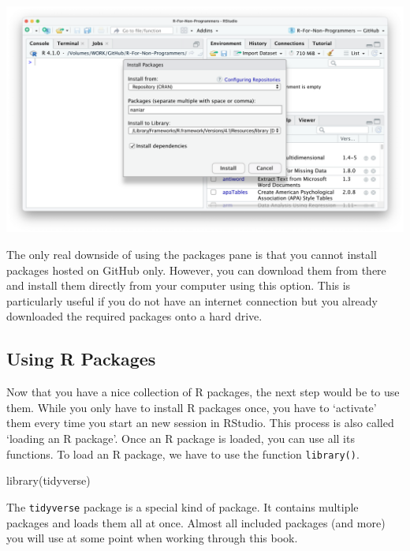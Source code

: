 \documentclass[
]{book}
\newenvironment{Shaded}{\begin{snugshade}}{\end{snugshade}}
\newcommand{\FunctionTok}[1]{\textcolor[rgb]{0.00,0.00,0.00}{#1}}
\newcommand{\NormalTok}[1]{#1}
\begin{document}
\begin{enumerate}
  \includegraphics{images/chapter_05_img/install_r_packages/03_install_r_packages.png}
\end{enumerate}

The only real downside of using the packages pane is that you cannot install packages hosted on GitHub only. However, you can download them from there and install them directly from your computer using this option. This is particularly useful if you do not have an internet connection but you already downloaded the required packages onto a hard drive.

\hypertarget{using-r-packages}{%
\subsection{Using R Packages}\label{using-r-packages}}

Now that you have a nice collection of R packages, the next step would be to use them. While you only have to install R packages once, you have to `activate' them every time you start an new session in RStudio. This process is also called `loading an R package'. Once an R package is loaded, you can use all its functions. To load an R package, we have to use the function \texttt{library()}.

\begin{Shaded}
\begin{Highlighting}[]
\FunctionTok{library}\NormalTok{(tidyverse)}
\end{Highlighting}
\end{Shaded}

The \texttt{tidyverse} package is a special kind of package. It contains multiple packages and loads them all at once. Almost all included packages (and more) you will use at some point when working through this book.
\end{document}
